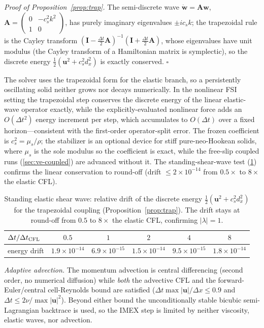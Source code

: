 \documentclass[final,3p,times]{elsarticle}
\theoremstyle{remark}
\newcommand{\uv}{\bm{u}}                 %
\newcommand{\dt}{\Delta t}
\newcommand{\dx}{\Delta x}
\begin{document}
\noindent\emph{Proof of Proposition~\ref{prop:trap}.} The semi-discrete wave
$\dot{\bm w}=\bm A\bm w$, $\bm A=\left(\begin{smallmatrix}0 & -c_s^2 k^2\\ 1 & 0\end{smallmatrix}\right)$,
has purely imaginary eigenvalues $\pm i c_s k$; the trapezoidal rule is the Cayley transform
$(\bm I-\tfrac{\dt}{2}\bm A)^{-1}(\bm I+\tfrac{\dt}{2}\bm A)$, whose eigenvalues have unit
modulus (the Cayley transform of a Hamiltonian matrix is symplectic), so the discrete energy
$\tfrac12(\uv^2+c_s^2 d_x^2)$ is exactly conserved. \hfill$\square$

\noindent The solver uses the trapezoidal form for the elastic branch, so a persistently
oscillating solid neither grows nor decays numerically. In the nonlinear FSI setting the
trapezoidal step conserves the discrete energy of the linear elastic-wave operator exactly,
while the explicitly-evaluated nonlinear force adds an $O(\dt^2)$ energy increment per step,
which accumulates to $O(\dt)$ over a fixed horizon---consistent with the first-order
operator-split error. The frozen coefficient is $c_s^2=\mu_s/\rho$; the stabilizer is an optional
device for stiff pure-neo-Hookean solids, where $\mu_s$ is the sole modulus
so the coefficient is exact, while the free-slip coupled runs (\cref{sec:ve-coupled}) are
advanced without it. The standing-shear-wave test (\cref{tab:energy-cons}) confirms the linear
conservation to round-off (drift $\le2\times10^{-14}$ from $0.5\times$ to $8\times$ the elastic
CFL).

\begin{table}[t]\centering\small
\caption{Standing elastic shear wave: relative drift of the discrete energy
$\tfrac12(\uv^2+c_s^2 d_x^2)$ for the trapezoidal coupling (Proposition~\ref{prop:trap}). The drift
stays at round-off from $0.5$ to $8\times$ the elastic CFL, confirming $|\lambda|=1$.}
\label{tab:energy-cons}
\begin{tabular}{@{}lccccc@{}}
\toprule
$\dt/\dt_{\rm CFL}$ & $0.5$ & $1$ & $2$ & $4$ & $8$ \\
\midrule
energy drift & $1.9\!\times\!10^{-14}$ & $6.9\!\times\!10^{-15}$ &
$1.5\!\times\!10^{-14}$ & $9.5\!\times\!10^{-15}$ & $1.8\!\times\!10^{-14}$ \\
\bottomrule
\end{tabular}
\end{table}

\emph{Adaptive advection.} The momentum advection is central differencing (second order, no
numerical diffusion) while \emph{both} the advective CFL and the forward-Euler/central
cell-Reynolds bound are satisfied ($\dt\max|\uv|/\dx\le0.9$ and $\dt\le2\nu/\max|\uv|^2$).
Beyond either bound the unconditionally stable bicubic semi-Lagrangian backtrace is used, so the
IMEX step is limited by neither viscosity, elastic waves, nor advection.
\end{document}
